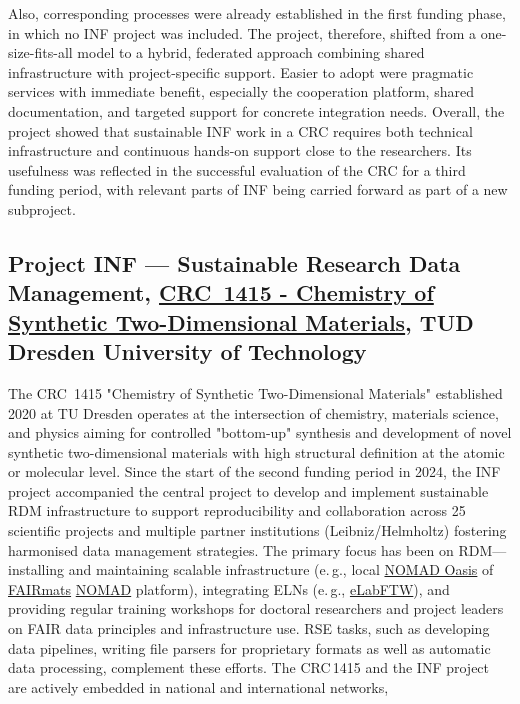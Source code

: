 \documentclass{eceasst}
\newcommand{\eg}{e.\,g.}
\newcommand{\elabftw}{\href{https://www.elabftw.net/}{eLabFTW}}
\begin{document}
Also, corresponding processes were already established in the first funding phase, in which no INF project was included.
The project, therefore, shifted from a one-size-fits-all model to a hybrid, federated approach combining shared infrastructure with project-specific support.
Easier to adopt were pragmatic services with immediate benefit, especially the cooperation platform, shared documentation, and targeted support for concrete integration needs.
Overall, the project showed that sustainable INF work in a CRC requires both technical infrastructure and continuous hands-on support close to the researchers.
Its usefulness was reflected in the successful evaluation of the CRC for a third funding period, with relevant parts of INF being carried forward as part of a new subproject.

\subsection{Project INF --- Sustainable Research Data Management, \href{https://gepris.dfg.de/gepris/projekt/417590517?language=en}{CRC~1415 -  Chemistry of Synthetic Two-Dimensional Materials}, TUD Dresden University of Technology}
\label{subsec:crc1415}
The CRC~1415 "Chemistry of Synthetic Two-Dimensional Materials" established 2020 at TU Dresden operates at the intersection of chemistry, materials science, and physics
 aiming for controlled "bottom-up" synthesis and development of novel synthetic two-dimensional materials with high structural definition at the atomic or molecular level.
Since the start of the second funding period in 2024, the INF project accompanied the central project to develop and implement sustainable RDM
infrastructure to support reproducibility and collaboration across 25 scientific projects and multiple partner institutions (Leibniz/Helmholtz) fostering harmonised data management strategies.
The primary focus has been on RDM—installing and maintaining scalable infrastructure
(\eg, local \href{https://nomad-lab.eu/nomad-lab/nomad-oasis.html}{NOMAD Oasis} of \href{https://www.fairmat-nfdi.eu/fairmat/}{FAIRmats} \href{https://nomad-lab.eu/nomad-lab/nomad.html}{NOMAD} platform),
integrating ELNs (\eg, \elabftw),
and providing regular training workshops for doctoral researchers and project leaders on FAIR data principles and infrastructure use.
RSE tasks, such as developing data pipelines, writing file parsers for proprietary formats as well as automatic data processing, complement these efforts.
The CRC\,1415 and the INF project are actively embedded in national and international networks,
\end{document}
